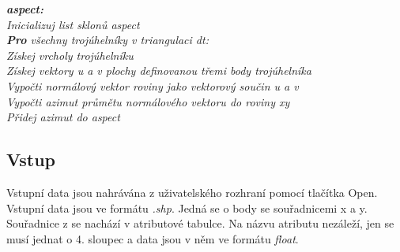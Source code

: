 \documentclass{article}
\begin{document}
\indent\textit{\textbf{aspect:}}\\
\indent\textit{Inicializuj list sklonů aspect}\\
\indent\textit{\textbf{Pro} všechny trojúhelníky v triangulaci dt:}\\
\indent\indent\textit{Získej vrcholy trojúhelníku}\\
\indent\indent\textit{Získej vektory u a v plochy definovanou třemi body trojúhelníka}\\
\indent\indent\textit{Vypočti normálový vektor roviny jako vektorový součin u a v}\\
\indent\indent\textit{Vypočti azimut průmětu normálového vektoru do roviny xy}\\
\indent\indent\textit{Přidej azimut do aspect}\\
\subsection{\small{Vstup}}
Vstupní data jsou nahrávána z uživatelského rozhraní pomocí tlačítka Open. Vstupní data jsou ve formátu \emph{.shp}. Jedná se o body se souřadnicemi x a y. Souřadnice z se nachází v atributové tabulce. Na názvu atributu nezáleží, jen se musí jednat o 4. sloupec a data jsou v něm ve formátu \emph{float}.
\end{document}
